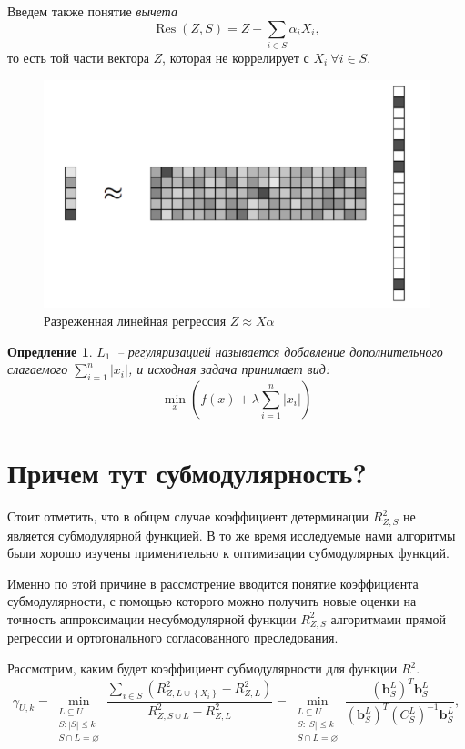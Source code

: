 \documentclass[preprint,12pt]{elsarticle}
\newtheorem{definition}{Опредление}
\begin{document}
Введем также понятие \textit{вычета}
\[\operatorname{Res}(Z, S)=Z-\sum\limits_{i \in S} \alpha_{i} X_{i},\]
то есть той части вектора $Z$, которая не коррелирует с $X_i~\forall i\in S$.

\begin{figure}[h]
\centering\includegraphics[width=0.6\linewidth]{Screenshot_1.png}
\caption{Разреженная линейная регрессия $Z\approx X\alpha$}
\end{figure}

\begin{definition}
\label{L1}
$L_1$~-- регуляризацией называется добавление дополнительного слагаемого $\sum\limits_{i = 1}^n |x_i|$, и исходная задача принимает вид: 
\[
\min\limits_{x}(f(x) + \lambda \sum\limits_{i = 1}^n|x_i|)
\]
\end{definition}

\section{Причем тут субмодулярность?}

Стоит отметить, что в общем случае коэффициент детерминации $R^2_{Z, S}$ не является субмодулярной функцией. В то же время исследуемые нами алгоритмы были хорошо изучены применительно к оптимизации субмодулярных функций. 

Именно по этой причине в рассмотрение вводится понятие коэффициента субмодулярности, с помощью которого можно получить новые оценки на точность аппроксимации несубмодулярной функции $R^2_{Z, S}$ алгоритмами прямой регрессии и ортогонального согласованного преследования.

Рассмотрим, каким будет коэффициент субмодулярности для функции $R^2$.
\[\gamma_{U, k}=\min_{\substack{L \subseteq U\\ S:|S| \leq k \\ S \cap L=\varnothing}} \frac{\sum_{i \in S}\left(R_{Z, L \cup\left\{X_{i}\right\}}^{2}-R_{Z, L}^{2}\right)}{R_{Z, S \cup L}^{2}-R_{Z, L}^{2}}=\min_{\substack{L \subseteq U\\ S:|S| \leq k \\ S \cap L=\varnothing}} \frac{\left(\mathbf{b}_{S}^{L}\right)^{T} \mathbf{b}_{S}^{L}}{\left(\mathbf{b}_{S}^{L}\right)^{T}\left(C_{S}^{L}\right)^{-1} \mathbf{b}_{S}^{L}},\]
\end{document}
